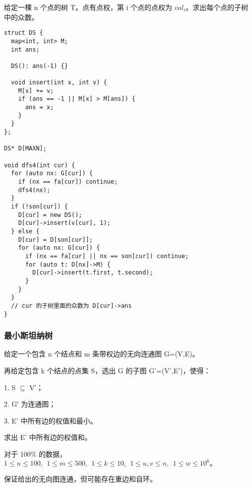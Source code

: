 \documentclass[UTF8]{ctexart}
\begin{document}
给定一棵 n 个点的树 T。点有点权，第 i 个点的点权为 $val_i$。求出每个点的子树中的众数。

\begin{framed}
\begin{lstlisting}
struct DS {
  map<int, int> M;
  int ans;

  DS(): ans(-1) {}

  void insert(int x, int v) {
    M[x] += v;
    if (ans == -1 || M[x] > M[ans]) {
      ans = x;
    }
  }
};

DS* D[MAXN];

void dfs4(int cur) {
  for (auto nx: G[cur]) {
    if (nx == fa[cur]) continue;
    dfs4(nx);
  }
  if (!son[cur]) {
    D[cur] = new DS();
    D[cur]->insert(v[cur], 1);
  } else {
    D[cur] = D[son[cur]];
    for (auto nx: G[cur]) {
      if (nx == fa[cur] || nx == son[cur]) continue;
      for (auto t: D[nx]->M) {
        D[cur]->insert(t.first, t.second);
      }
    }
  }
  // cur 的子树里面的众数为 D[cur]->ans
}
\end{lstlisting}
\end{framed}

\subsubsection{最小斯坦纳树}

给定一个包含 n 个结点和 m 条带权边的无向连通图 G=(V,E)。

再给定包含 k 个结点的点集 S，选出 G 的子图 G'=(V',E')，使得：

1. S $\subseteq$ V′；

2. G′ 为连通图；

3. E' 中所有边的权值和最小。

求出 E' 中所有边的权值和。

对于 100\% 的数据，$1\leq n\leq 100,\ \ 1\leq m\leq 500,\ \ 1\leq k\leq 10,\ \ 1\leq u,v\leq n,\ \ 1\leq w\leq 10^6。$

保证给出的无向图连通，但可能存在重边和自环。
\end{document}
